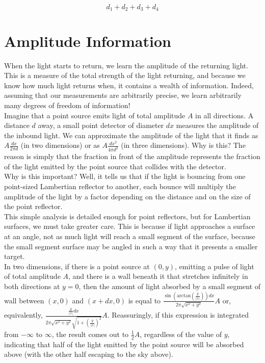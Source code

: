 \documentclass[11pt]{article}
\begin{document}
$$d_1 + d_2 + d_3 + d_4$$

\section{Amplitude Information}

When the light starts to return, we learn the amplitude of the returning light. This is a measure of the total strength of the light returning, and because we know how much light returns when, it contains a wealth of information. Indeed, assuming that our measurements are arbitrarily precise, we learn arbitrarily many degrees of freedom of information! \\

Imagine that a point source emits light of total amplitude $A$ in all directions. A distance $d$ away, a small point detector of diameter $dx$ measures the amplitude of the inbound light. We can approximate the amplitude of the light that it finds as $A \frac{dx}{2\pi d}$ (in two dimensions) or as $A \frac{dx^2}{4\pi d^2}$ (in three dimensions). Why is this? The reason is simply that the fraction in front of the amplitude represents the fraction of the light emitted by the point source that collides with the detector. \\

Why is this important? Well, it tells us that if the light is bouncing from one point-sized Lambertian reflector to another, each bounce will multiply the amplitude of the light by a factor depending on the distance and on the size of the point reflector. \\

This simple analysis is detailed enough for point reflectors, but for Lambertian surfaces, we must take greater care. This is because if light approaches a surface at an angle, not as much light will reach a small segment of the surface, because the small segment surface may be angled in such a way that it presents a smaller target. \\

In two dimensions, if there is a point source at $(0, y)$, emitting a pulse of light of total amplitude $A$, and there is a wall beneath it that stretches infinitely in both directions at $y = 0$, then the amount of light absorbed by a small segment of wall between $(x, 0)$ and $(x+dx, 0)$ is equal to $\frac{\sin(\mathrm{arctan}(\frac{y}{|x|})) dx}{2 \pi \sqrt{x^2+y^2}}A$ or, equivalently, $\frac{\frac{y}{|x|} dx}{2 \pi \sqrt{x^2+y^2}\sqrt{1+(\frac{y}{|x|})^2}}A$. Reassuringly, if this expression is integrated from $-\infty$ to $\infty$, the result comes out to $\frac{1}{2}A$, regardless of the value of $y$, indicating that half of the light emitted by the point source will be absorbed above (with the other half escaping to the sky above). \\
\end{document}
